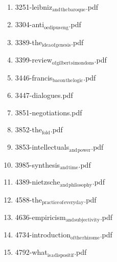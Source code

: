 \documentclass[11pt]{article}
\begin{document}
\begin{enumerate}
\begin{enumerate}
\begin{enumerate}
\item 3251-leibniz$_{\text{and}}$$_{\text{the}}$$_{\text{baroque}}$.pdf
\label{sec-1-1-1-1-11-29-19-23-17}

\item 3304-anti$_{\text{oedipus}}$$_{\text{eng}}$.pdf
\label{sec-1-1-1-1-11-29-19-23-18}

\item 3389-the$_{\text{idea}}$$_{\text{of}}$$_{\text{genesis}}$.pdf
\label{sec-1-1-1-1-11-29-19-23-19}

\item 3399-review$_{\text{of}}$$_{\text{gilbert}}$$_{\text{simondons}}$.pdf
\label{sec-1-1-1-1-11-29-19-23-20}

\item 3446-francis$_{\text{bacon}}$$_{\text{the}}$$_{\text{logic}}$.pdf
\label{sec-1-1-1-1-11-29-19-23-21}

\item 3447-dialogues.pdf
\label{sec-1-1-1-1-11-29-19-23-22}

\item 3851-negotiations.pdf
\label{sec-1-1-1-1-11-29-19-23-23}

\item 3852-the$_{\text{fold}}$.pdf
\label{sec-1-1-1-1-11-29-19-23-24}

\item 3853-intellectuals$_{\text{and}}$$_{\text{power}}$.pdf
\label{sec-1-1-1-1-11-29-19-23-25}

\item 3985-synthesis$_{\text{and}}$$_{\text{time}}$.pdf
\label{sec-1-1-1-1-11-29-19-23-26}

\item 4389-nietzsche$_{\text{and}}$$_{\text{philosophy}}$.pdf
\label{sec-1-1-1-1-11-29-19-23-27}

\item 4588-the$_{\text{practice}}$$_{\text{of}}$$_{\text{everyday}}$.pdf
\label{sec-1-1-1-1-11-29-19-23-28}

\item 4636-empiricism$_{\text{and}}$$_{\text{subjectivity}}$.pdf
\label{sec-1-1-1-1-11-29-19-23-29}

\item 4734-introduction$_{\text{of}}$$_{\text{the}}$$_{\text{rhizome}}$.pdf
\label{sec-1-1-1-1-11-29-19-23-30}

\item 4792-what$_{\text{is}}$$_{\text{a}}$$_{\text{dispositif}}$.pdf
\label{sec-1-1-1-1-11-29-19-23-31}


\end{enumerate}
\end{enumerate}
\end{enumerate}
\end{document}
